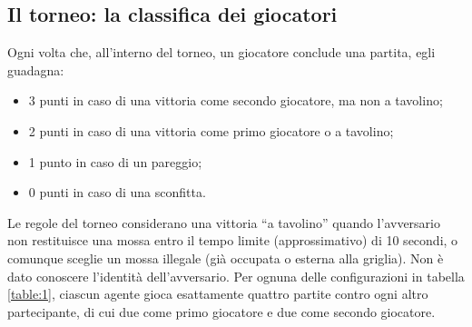 \documentclass{article}
\begin{document}
\subsection{Il torneo: la classifica dei giocatori} \label{tournament}

Ogni volta che, all'interno del torneo, un giocatore conclude una partita, egli
guadagna: 
\begin{itemize}
  \item 3 punti in caso di una vittoria come secondo giocatore, ma non a
    tavolino;
  \item 2 punti in caso di una vittoria come primo giocatore o a tavolino;
  \item 1 punto in caso di un pareggio;
  \item 0 punti in caso di una sconfitta.
\end{itemize}

\noindent
Le regole del torneo considerano una vittoria ``a tavolino'' quando l'avversario
non restituisce una mossa entro il tempo limite (approssimativo) di 10 secondi,
o comunque sceglie un mossa illegale (già occupata o esterna alla griglia). Non
è dato conoscere l'identità dell'avversario. Per ognuna delle configurazioni in
tabella \ref{table:1}, ciascun agente gioca esattamente quattro partite contro
ogni altro partecipante, di cui due come primo giocatore e due come secondo
giocatore.
\end{document}

